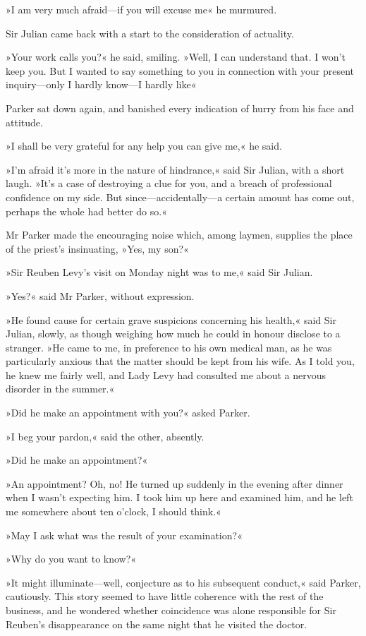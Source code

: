 »I am very much afraid\allowbreak---\allowbreak if you will excuse me\longdash« he murmured.

Sir Julian came back with a start to the consideration of actuality.

»Your work calls you?« he said, smiling. »Well, I can understand that. I won't keep you. But I wanted to say something to you in connection with your present inquiry\allowbreak---\allowbreak only I hardly know\allowbreak---\allowbreak I hardly like\longdash«

Parker sat down again, and banished every indication of hurry from his face and attitude.

»I shall be very grateful for any help you can give me,« he said.

»I'm afraid it's more in the nature of hindrance,« said Sir Julian, with a short laugh. »It's a case of destroying a clue for you, and a breach of professional confidence on my side. But since\allowbreak---\allowbreak accidentally---a certain amount has come out, perhaps the whole had better do so.«

Mr Parker made the encouraging noise which, among laymen, supplies the place of the priest's insinuating, »Yes, my son?«

»Sir Reuben Levy's visit on Monday night was to me,« said Sir Julian.

»Yes?« said Mr Parker, without expression.

»He found cause for certain grave suspicions concerning his health,« said Sir Julian, slowly, as though weighing how much he could in honour disclose to a stranger. »He came to me, in preference to his own medical man, as he was particularly anxious that the matter should be kept from his wife. As I told you, he knew me fairly well, and Lady Levy had consulted me about a nervous disorder in the summer.«

»Did he make an appointment with you?« asked Parker.

»I beg your pardon,« said the other, absently.

»Did he make an appointment?«

»An appointment? Oh, no! He turned up suddenly in the evening after dinner when I wasn't expecting him. I took him up here and examined him, and he left me somewhere about ten o'clock, I should think.«

»May I ask what was the result of your examination?«

»Why do you want to know?«

»It might illuminate\allowbreak---\allowbreak well, conjecture as to his subsequent conduct,« said Parker, cautiously. This story seemed to have little coherence with the rest of the business, and he wondered whether coincidence was alone responsible for Sir Reuben's disappearance on the same night that he visited the doctor.

